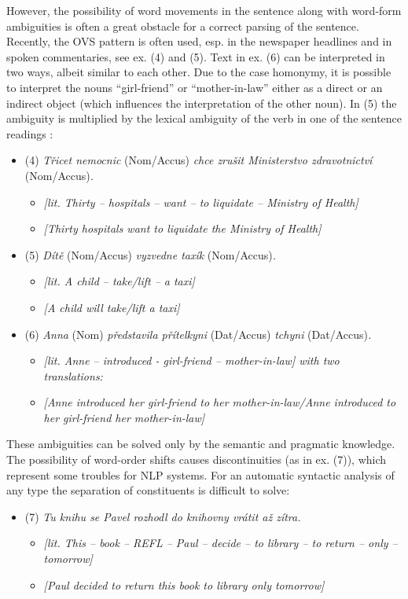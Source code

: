 \begin{multicols}{2}
However, the possibility of word movements in the sentence along with word-form ambiguities is often a great obstacle for a correct parsing of the sentence. Recently, the OVS pattern is often used, esp. in the newspaper headlines and in spoken commentaries, see ex. (4) and (5). Text in ex. (6) can be interpreted in two ways, albeit similar to each other. Due to the case homonymy, it is possible to interpret the nouns “girl-friend” or “mother-in-law” either as a direct or an indirect object (which influences the interpretation of the other noun). In (5) the ambiguity is multiplied by the lexical ambiguity of the verb in one of the sentence readings \cite{Note4_en}:
\begin{itemize}	
\item[] (4)	\textit{Třicet nemocnic} (Nom/Accus) \textit{chce zrušit Ministerstvo zdravotnictví} (Nom/Accus)\textit{.}
\begin{itemize}	
	\item[] \textit{{[}lit. Thirty – hospitals – want – to liquidate – Ministry of Health{]}}
	\item[] \textit{{[}Thirty hospitals want to liquidate the Ministry of Health{]}}
\end{itemize}
 \item[](5)	\textit{Dítě} (Nom/Accus) \textit{vyzvedne taxík} (Nom/Accus)\textit{.}
\begin{itemize}	
	\item[] \textit{{[}lit. A child – take/lift – a taxi{]}}
	\item[] \textit{{[}A child will take/lift a taxi{]}}
\end{itemize}
 \item[](6)	\textit{Anna} (Nom) \textit{představila přítelkyni} (Dat/Accus) \textit{tchyni} (Dat/Accus)\textit{.}
\begin{itemize}	
	\item[] \textit{{[}lit. Anne – introduced -  girl-friend –  mother-in-law{]} with two translations:}
	\item[] \textit{{[}Anne introduced her girl-friend to her mother-in-law/Anne introduced to her girl-friend her mother-in-law{]}}
\end{itemize}
\end{itemize}

These ambiguities can be solved only by the semantic and pragmatic knowledge.
The possibility of word-order shifts causes discontinuities (as in ex. (7)), which represent some troubles for NLP systems. For an automatic syntactic analysis of any type the separation of constituents is difficult to solve:
\begin{itemize}
 \item[] (7)	\textit{Tu knihu se Pavel rozhodl do knihovny vrátit až zítra.}
\begin{itemize}	
	\item[] \textit{{[}lit. This – book – REFL – Paul – decide – to library – to return – only – tomorrow{]}}
	\item[] \textit{{[}Paul decided to return this book to library only tomorrow{]}}
\end{itemize}
\end{itemize}

\end{multicols}
